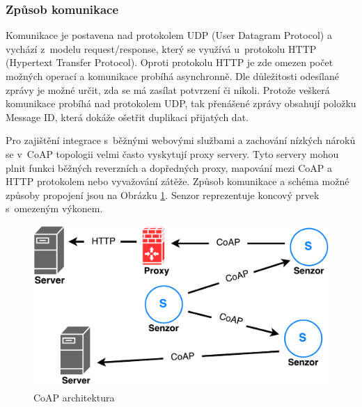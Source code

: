    \subsubsection{Způsob komunikace}
   Komunikace je postavena nad protokolem UDP (User Datagram Protocol) a vychází
   z~modelu request/response, který se využívá u~protokolu HTTP (Hypertext
   Transfer Protocol). Oproti protokolu HTTP je zde omezen počet možných operací
   a komunikace probíhá asynchronně. Dle důležitosti odesílané zprávy je možné určit,
   zda se má zasílat potvrzení či nikoli. Protože veškerá komunikace probíhá nad
   protokolem UDP, tak přenášené zprávy obsahují položku Message ID, která dokáže
   ošetřit duplikaci přijatých dat.
   
   Pro zajištění integrace s~běžnými webovými službami a zachování nízkých nároků
   se v~CoAP topologii velmi často vyskytují proxy servery. Tyto servery mohou plnit
   funkci běžných reverzních a dopředných proxy, mapování mezi CoAP a HTTP protokolem
   nebo vyvažování zátěže. Způsob komunikace a schéma možné způsoby propojení jsou na
   Obrázku \ref{obr.coap-arch}. Senzor reprezentuje koncový prvek s~omezeným výkonem.
   
   \begin{figure}[ht]
   \begin{center}
   \includegraphics[scale=0.41]{pictures/coap-arch}
   \caption{CoAP architektura}
   \label{obr.coap-arch}
   \end{center}
   \end{figure}
   
